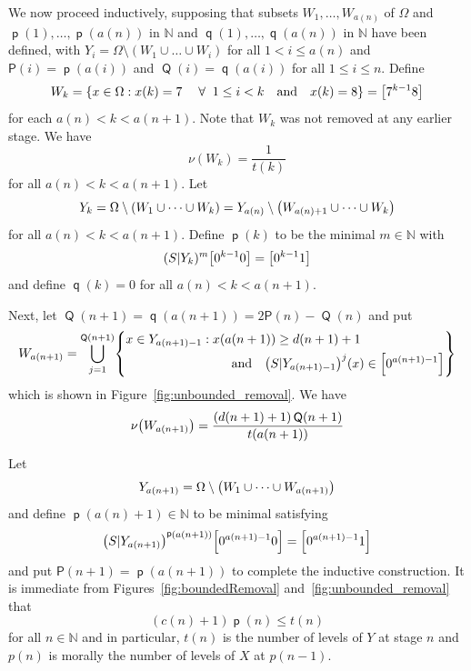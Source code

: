 \documentclass[AHL,Unicode,longabstracts,published]{cedram}
\DeclareMathOperator{\p}{\mathsf{p}}
\DeclareMathOperator{\q}{\mathsf{q}}
\DeclareMathOperator{\Q}{\mathsf{Q}}
\newcommand{\N}{\mathbb{N}}
\renewcommand{\P}{\mathsf{P}}
\let\originalleft\left
\let\originalright\right
\renewcommand{\left}{\mathopen{}\mathclose\bgroup\originalleft}
\renewcommand{\right}{\aftergroup\egroup\originalright}
\let\oldforall\forall
\renewcommand*{\forall}{\mathrel{\oldforall}}
\begin{document}
\pagebreak
We now proceed inductively, supposing that subsets $W_1,\dots,W_{a(n)}$ of $\Omega$ and $\p(1),\dots,\p(a(n))$ in $\N$ and $\q(1),\dots,\q(a(n))$ in $\N$ have been defined, with $Y_i = \Omega \setminus (W_1 \cup \dots \cup W_i)$ for all $1 < i \le a(n)$ and $\P(i) = \p(a(i))$ and $\Q(i) = \q(a(i))$ for all $1 \le i \le n$. Define
\[
W_k =
\left\{ x \in \Omega : x(k) = 7 \quad\forall\; 1 \le i < k \quad\text{and}\quad x(k) = 8 \right\} = \left[7^{k-1}8\right]
\]
for each $a(n) < k < a(n+1)$. Note that $W_k$ was not removed at any earlier stage. We have
\begin{equation}\label{eqn:meas_bounded_removal}
\nu(W_k) = \frac{1}{t(k)}
\end{equation}
for all $a(n) < k < a(n+1)$. Let
\[
Y_k =
\Omega \setminus (W_1 \cup \dots \cup W_k) = Y_{a(n)} \setminus \left(W_{a(n)+1} \cup \dots \cup W_k\right)
\]
for all $a(n) < k < a(n+1)$. Define $\p(k)$ to be the minimal $m \in \N$ with
\[
(S|Y_k)^m \left[0^{k-1}0\right] = \left[0^{k-1}1\right]
\]
and define $\q(k) = 0$ for all $a(n) < k < a(n+1)$.

Next, let $\Q(n+1) = \q(a(n+1)) = 2 \P(n) - \Q(n)$ and put
\[
W_{a(n+1)} =
\bigcup_{j=1}^{\Q(n+1)}
\left\{
\begin{aligned}
&x \in Y_{a(n+1)-1} : x(a(n+1)) \ge d(n+1) + 1\\
&\mkern150mu\text{and}\quad \left(S|Y_{a(n+1)-1}\right)^j(x) \in \left[0^{a(n+1)-1}\right]
\end{aligned}
\right\}
\]
which is shown in Figure~\ref{fig:unbounded_removal}. We have
\begin{equation}\label{eqn:meas_unbounded_removal}
\nu\left(W_{a(n+1)}\right) = \frac{(d(n+1)+1) \Q(n+1)}{t(a(n+1))}
\end{equation}

Let
\[
Y_{a(n+1)} = \Omega \setminus \left(W_1 \cup \dots \cup W_{a(n+1)}\right)
\]
and define $\p(a(n)+1) \in \N$ to be minimal satisfying
\[
\left(S|Y_{a(n+1)}\right)^{\p(a(n+1))}\left[0^{a(n+1)-1} 0\right] = \left[0^{a(n+1) - 1}1\right]
\]
and put $\P(n+1) = \p(a(n+1))$ to complete the inductive construction. It is immediate from Figures~\ref{fig:boundedRemoval} and~\ref{fig:unbounded_removal} that
\begin{equation}\label{eqn:pn_bound}
(c(n) + 1) \p(n) \le t(n)
\end{equation}
for all $n \in \N$ and in particular, $t(n)$ is the number of levels of $Y$ at stage $n$ and $p(n)$ is morally the number of levels of $X$ at $p(n-1)$.
\end{document}
